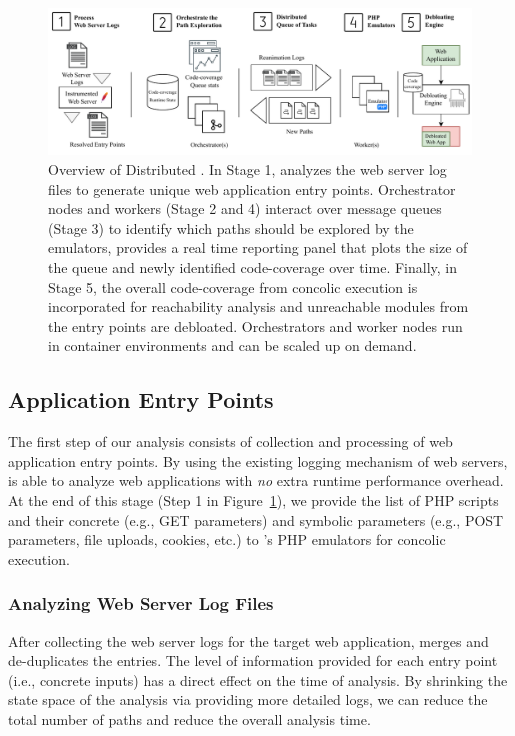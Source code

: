 \begin{figure}[t]
    \centering
    \includegraphics[width=\textwidth]{figures/ad/animatedead_diagram.pdf}
    \caption{Overview of Distributed \animatedead{}. In Stage 1, \animatedead{} analyzes the web server log files to generate unique web application entry points. Orchestrator nodes and workers (Stage 2 and 4) interact over message queues (Stage 3) to identify which paths should be explored by the emulators, \animatedead{} provides a real time reporting panel that plots the size of the queue and newly identified code-coverage over time. Finally, in Stage 5, the overall code-coverage from concolic execution is incorporated for reachability analysis and unreachable modules from the entry points are debloated. Orchestrators and worker nodes run in container environments and can be scaled up on demand.}
    \label{fig:ad_diagram}
    \vspace{-1em}
\end{figure}

\subsection{Application Entry Points}
The first step of our analysis consists of collection and processing of web application entry points.  
By using the existing logging mechanism of web servers, \animatedead{} is able to analyze web applications with \emph{no} extra runtime performance overhead. 
At the end of this stage (Step 1 in Figure~\ref{fig:ad_diagram}), we provide the list of PHP scripts and their concrete (e.g., GET parameters) and symbolic parameters (e.g., POST parameters, file uploads, cookies, etc.) to \animatedead{}'s PHP emulators for concolic execution. 

\subsubsection*{Analyzing Web Server Log Files} 
After collecting the web server logs for the target web application, \animatedead{} merges and de-duplicates the entries. 
The level of information provided for each entry point (i.e., concrete inputs) has a direct effect on the time of analysis. 
By shrinking the state space of the analysis via providing more detailed logs, we can reduce the total number of paths and reduce the overall analysis time. 

